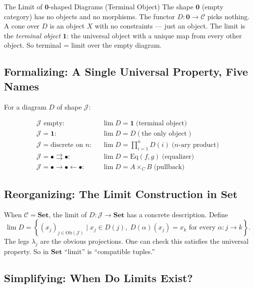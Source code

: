 \begin{example}{The Limit of $\mathbf{0}$-shaped Diagrams (Terminal Object)}
The shape $\mathbf{0}$ (empty category) has no objects and no morphisms.
The functor $D : \mathbf{0} \to \mathcal{C}$ picks nothing. A cone over
$D$ is an object $X$ with no constraints --- just an object. The limit is
the \emph{terminal object} $\mathbf{1}$: the universal object with a
unique map from every other object. So terminal = limit over the empty
diagram.
\end{example}

\subsection{Formalizing: A Single Universal Property, Five Names}

For a diagram $D$ of shape $\mathcal{J}$:

\begin{align*}
  \mathcal{J} \text{ empty:} & \;\; \lim D = \mathbf{1} \;\text{(terminal object)} \\
  \mathcal{J} = \mathbf{1}:  & \;\; \lim D = D(\text{the only object}) \\
  \mathcal{J} = \text{discrete on } n: & \;\; \lim D = \prod_{i=1}^n D(i) \;\text{($n$-ary product)} \\
  \mathcal{J} = \bullet \rightrightarrows \bullet: & \;\; \lim D = \mathrm{Eq}(f, g) \;\text{(equalizer)} \\
  \mathcal{J} = \bullet \to \bullet \leftarrow \bullet: & \;\; \lim D = A \times_C B \;\text{(pullback)}
\end{align*}

\subsection{Reorganizing: The Limit Construction in $\mathbf{Set}$}

When $\mathcal{C} = \mathbf{Set}$, the limit of $D : \mathcal{J} \to
\mathbf{Set}$ has a concrete description. Define
\begin{equation*}
  \lim D = \left\{ (x_j)_{j \in \mathrm{Ob}(\mathcal{J})}
  \;\Big|\; x_j \in D(j),\;
  D(\alpha)(x_j) = x_k \text{ for every } \alpha : j \to k \right\}.
\end{equation*}
The legs $\lambda_j$ are the obvious projections. One can check this
satisfies the universal property. So in $\mathbf{Set}$ ``limit'' is
``compatible tuples.''

\subsection{Simplifying: When Do Limits Exist?}

